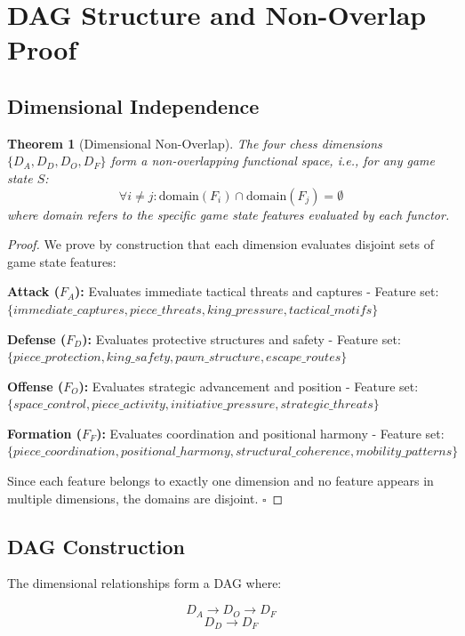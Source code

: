 \documentclass[12pt,a4paper]{article}
\newtheorem{theorem}{Theorem}
\begin{document}
\section{DAG Structure and Non-Overlap Proof}

\subsection{Dimensional Independence}

\begin{theorem}[Dimensional Non-Overlap]
The four chess dimensions $\{D_A, D_D, D_O, D_F\}$ form a non-overlapping functional space, i.e., for any game state $S$:
$$\forall i \neq j: \text{domain}(F_i) \cap \text{domain}(F_j) = \emptyset$$
where domain refers to the specific game state features evaluated by each functor.
\end{theorem}

\begin{proof}
We prove by construction that each dimension evaluates disjoint sets of game state features:

\textbf{Attack ($F_A$):} Evaluates immediate tactical threats and captures
- Feature set: $\{immediate\_captures, piece\_threats, king\_pressure, tactical\_motifs\}$

\textbf{Defense ($F_D$):} Evaluates protective structures and safety
- Feature set: $\{piece\_protection, king\_safety, pawn\_structure, escape\_routes\}$

\textbf{Offense ($F_O$):} Evaluates strategic advancement and position
- Feature set: $\{space\_control, piece\_activity, initiative\_pressure, strategic\_threats\}$

\textbf{Formation ($F_F$):} Evaluates coordination and positional harmony
- Feature set: $\{piece\_coordination, positional\_harmony, structural\_coherence, mobility\_patterns\}$

Since each feature belongs to exactly one dimension and no feature appears in multiple dimensions, the domains are disjoint. $\square$
\end{proof}

\subsection{DAG Construction}

The dimensional relationships form a DAG where:

$$D_A \rightarrow D_O \rightarrow D_F$$
$$D_D \rightarrow D_F$$
\end{document}
